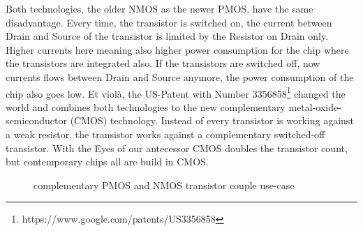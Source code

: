Both technologies, the older NMOS as the newer PMOS, have the same disadvantage. Every time, the transistor is switched on, the current between Drain and Source of the transistor is limited by the Resistor on Drain only. Higher currents here meaning also higher power consumption for the chip where the transistors are integrated also. If the transistors are switched off, now currents flows between Drain and Source anymore, the power consumption of the chip also goes low.
Et violà, the US-Patent with Number 3356858\footnote{https://www.google.com/patents/US3356858} changed the world and combines both technologies to the new complementary metal-oxide-semiconductor (CMOS) technology. Instead of every transistor is working against a weak resistor, the transistor works against a complementary switched-off transistor. With the Eyes of our antecessor CMOS doubles the transistor count, but contemporary chips all are build in CMOS.

\begin{center}
	\begin{figure}[h]
		\begin{center}
			\begin{circuitdiagram}{20}{20}
			\end{circuitdiagram}
		\end{center}
		\caption{complementary PMOS and NMOS transistor couple use-case}
	\end{figure}
\end{center}

